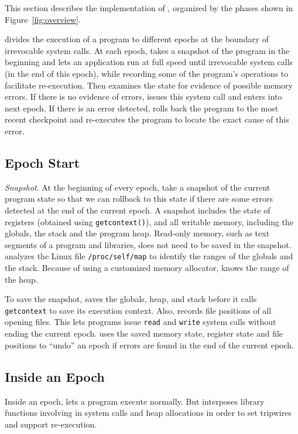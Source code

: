 \label{sec:implementation}

This section describes the implementation of \doubletake{}, organized by the phases shown in Figure~\ref{fig:overview}. 

\doubletake{} divides the execution of a program to different epochs at the boundary of irrevocable system calls. At each epoch, \doubletake{} takes a snapshot of the program in the beginning and lets an application run at full speed until irrevocable system calls (in the end of this epoch), while recording some of the program's operations to facilitate re-execution. Then \doubletake{} examines the state for evidence of possible memory errors. 
If there is no evidence of errors, \doubletake{} issues this system call and enters into next epoch. If there is an error detected, \doubletake{} rolls back the program to the most recent checkpoint and re-executes the program to locate the exact cause of this error. 

\subsection{Epoch Start}
{\em Snapshot}. 
At the beginning of every epoch, \doubletake{} take a snapshot of the current program state so that we can rollback to this state if there are some errors detected at the end of the current epoch. A snapshot includes the state of registers (obtained using \texttt{getcontext()}), and all writable memory, including the globals, the stack and the program heap. 
Read-only memory, such as text segments of a program and libraries, does not need to be saved in the snapshot. \doubletake{} analyzes the Linux file \texttt{/proc/self/map} 
to identify the ranges of the globals and the stack. Because of using a customized memory allocator, \doubletake{} knows the range of the heap. 

To save the snapshot, \doubletake{} saves the globals, heap, and stack before it calls \texttt{getcontext} to save its execution context. Also, \doubletake{} records file positions of all opening files. This lets programs issue \texttt{read} and \texttt{write} system calls without 
ending the current epoch. \doubletake{} uses the saved memory state, register state and file positions to ``undo'' an epoch if errors are found in the end of the current epoch. 

\subsection{Inside an Epoch}
\label{sec:inepoch}
Inside an epoch, \doubletake{} lets a program execute normally. But \doubletake{} interposes  library functions involving in system calls and heap allocations in order to set tripwires and support re-execution. 

